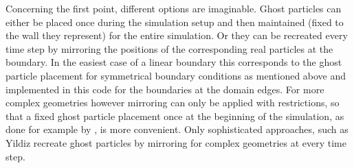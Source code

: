 \documentclass{report}
\begin{document}
Concerning the first point, different options are imaginable. Ghost particles can either be placed once during the simulation setup and then maintained (fixed to the wall they represent) for the entire simulation. Or they can be recreated every time step by mirroring the positions of the corresponding real particles at the boundary. In the easiest case of a linear boundary this corresponds to the ghost particle placement for symmetrical boundary conditions as mentioned above and implemented in this code for the boundaries at the domain edges.
For more complex geometries however mirroring can only be applied with restrictions, so that a fixed ghost particle placement once at the beginning of the simulation, as done for example by \cite{Morris1997, Zhu1999}, is more convenient. Only sophisticated approaches, such as Yildiz \cite{Yildiz2009} recreate ghost particles by mirroring for complex geometries at every time step.
\end{document}
